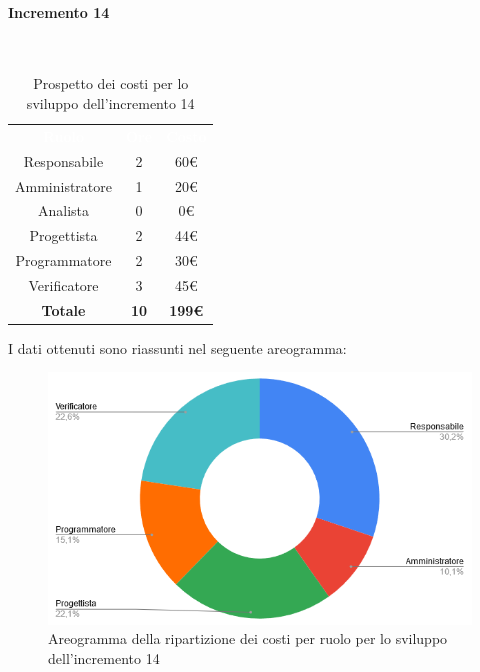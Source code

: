 \paragraph*{Incremento 14}\mbox{} \\
\begin{table}[H]
\centering\renewcommand{\arraystretch}{1.5}
\caption{Prospetto dei costi per lo sviluppo dell'incremento 14}
\vspace{0.2cm}
\begin{tabular}{ c c c }
\rowcolor{redafk}
\textcolor{white}{\textbf{Ruolo}} & \textcolor{white}{\textbf{Ore}} &
\textcolor{white}{\textbf{Costo}}  \\
Responsabile & 2 & 60€ \\
Amministratore & 1 & 20€ \\
Analista & 0 & 0€ \\
Progettista & 2 & 44€ \\
Programmatore & 2 & 30€  \\
Verificatore & 3 & 45€  \\
\rowcolor{lastrowcolor}
\textbf{Totale} & \textbf{10} & \textbf{199€}  \\
\end{tabular}
\end{table}
 
I dati ottenuti sono riassunti nel seguente areogramma:
\begin{figure}[H]
\centering
\includegraphics[scale=0.60]{img/grafici/torta_inc14.png}
\caption{Areogramma della ripartizione dei costi per ruolo per lo sviluppo dell'incremento 14}
\end{figure}


